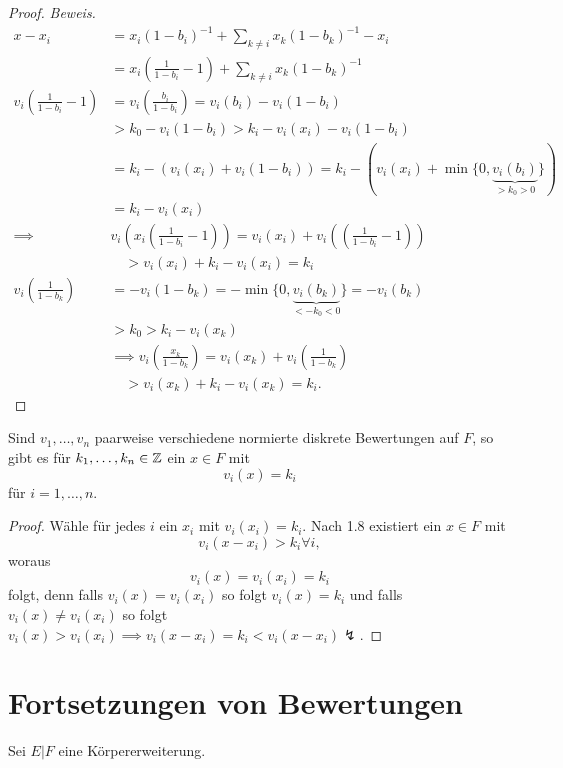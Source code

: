 \begin{proof}
    \emph{Beweis.}
    \begin{align*}
        x - x_i &= x_i(1-b_i)^{-1} + \sum\limits_{k \ne i} x_k(1-b_k)^{-1} - x_i \\
            & = x_i \left(\frac{1}{1-b_i} - 1\right) + \sum\limits_{k\ne i} x_k (1-b_k)^{-1}\\
        v_i\left(\frac{1}{1-b_i} - 1\right) & = v_i\left(\frac{b_i}{1-b_i}\right) = v_i(b_i) - v_i(1-b_i)\\
            & > k_0 - v_i(1-b_i) > k_i - v_i(x_i) -v_i(1-b_i)\\
            & = k_i - (v_i(x_i) + v_i(1-b_i)) = k_i - (v_i(x_i) + \min\{0, \underbrace{v_i(b_i)}_{>k_0>0}\})\\
            & = k_i - v_i(x_i)\\
        \implies & v_i\left(x_i \left(\frac{1}{1-b_i} - 1\right)\right) = v_i(x_i) + v_i\left(\left(\frac{1}{1-b_i} - 1\right)\right) \\
            & \quad > v_i(x_i) + k_i - v_i(x_i) = k_i\\
        v_i\left(\frac{1}{1-b_k}\right) & = -v_i(1-b_k) = -\min \{0, \underbrace{v_i(b_k)}_{<-k_0 < 0}\} = -v_i(b_k)\\
            & > k_0 > k_i - v_i(x_k)\\
            & \implies v_i\left(\frac{x_k}{1-b_k}\right) = v_i(x_k) + v_i\left(\frac{1}{1-b_k}\right) \\
            & \quad > v_i(x_k) + k_i - v_i(x_k) = k_i.
    \end{align*}
\end{proof}

\begin{korollar}
    Sind $v_1,\ldots,v_n$ paarweise verschiedene normierte diskrete Bewertungen auf $F$, so gibt es für $k_1,\ldots,k_n \in \mathbb{Z}$
    ein $x \in F$ mit
    $$ v_i(x) = k_i$$
    für $i= 1,\ldots,n$.
\end{korollar}
\begin{proof}
    Wähle für jedes $i$ ein $x_i$ mit $v_i(x_i)=k_i$. 
    Nach 1.8 existiert ein $x \in F$ mit $$v_i(x-x_i) > k_i \forall i,$$
    woraus $$ v_i(x) = v_i(x_i) = k_i$$
    folgt, denn falls $v_i(x) = v_i(x_i)$ so folgt $v_i(x) = k_i$ und falls
    $v_i(x) \ne v_i(x_i)$ so folgt $v_i(x) > v_i(x_i) \implies v_i(x-x_i) = k_i < v_i(x-x_i) \lightning$.
\end{proof}

\section{Fortsetzungen von Bewertungen}
Sei $E|F$ eine Körpererweiterung.

